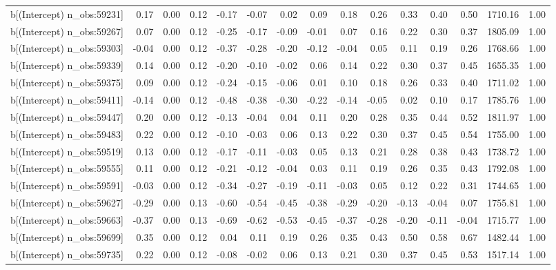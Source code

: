 \begin{table}[ht]
\begin{tabular}{rrrrrrrrrrrrrrr}
  b[(Intercept) n\_obs:59231] & 0.17 & 0.00 & 0.12 & -0.17 & -0.07 & 0.02 & 0.09 & 0.18 & 0.26 & 0.33 & 0.40 & 0.50 & 1710.16 & 1.00 \\ 
  b[(Intercept) n\_obs:59267] & 0.07 & 0.00 & 0.12 & -0.25 & -0.17 & -0.09 & -0.01 & 0.07 & 0.16 & 0.22 & 0.30 & 0.37 & 1805.09 & 1.00 \\ 
  b[(Intercept) n\_obs:59303] & -0.04 & 0.00 & 0.12 & -0.37 & -0.28 & -0.20 & -0.12 & -0.04 & 0.05 & 0.11 & 0.19 & 0.26 & 1768.66 & 1.00 \\ 
  b[(Intercept) n\_obs:59339] & 0.14 & 0.00 & 0.12 & -0.20 & -0.10 & -0.02 & 0.06 & 0.14 & 0.22 & 0.30 & 0.37 & 0.45 & 1655.35 & 1.00 \\ 
  b[(Intercept) n\_obs:59375] & 0.09 & 0.00 & 0.12 & -0.24 & -0.15 & -0.06 & 0.01 & 0.10 & 0.18 & 0.26 & 0.33 & 0.40 & 1711.02 & 1.00 \\ 
  b[(Intercept) n\_obs:59411] & -0.14 & 0.00 & 0.12 & -0.48 & -0.38 & -0.30 & -0.22 & -0.14 & -0.05 & 0.02 & 0.10 & 0.17 & 1785.76 & 1.00 \\ 
  b[(Intercept) n\_obs:59447] & 0.20 & 0.00 & 0.12 & -0.13 & -0.04 & 0.04 & 0.11 & 0.20 & 0.28 & 0.35 & 0.44 & 0.52 & 1811.97 & 1.00 \\ 
  b[(Intercept) n\_obs:59483] & 0.22 & 0.00 & 0.12 & -0.10 & -0.03 & 0.06 & 0.13 & 0.22 & 0.30 & 0.37 & 0.45 & 0.54 & 1755.00 & 1.00 \\ 
  b[(Intercept) n\_obs:59519] & 0.13 & 0.00 & 0.12 & -0.17 & -0.11 & -0.03 & 0.05 & 0.13 & 0.21 & 0.28 & 0.38 & 0.43 & 1738.72 & 1.00 \\ 
  b[(Intercept) n\_obs:59555] & 0.11 & 0.00 & 0.12 & -0.21 & -0.12 & -0.04 & 0.03 & 0.11 & 0.19 & 0.26 & 0.35 & 0.43 & 1792.08 & 1.00 \\ 
  b[(Intercept) n\_obs:59591] & -0.03 & 0.00 & 0.12 & -0.34 & -0.27 & -0.19 & -0.11 & -0.03 & 0.05 & 0.12 & 0.22 & 0.31 & 1744.65 & 1.00 \\ 
  b[(Intercept) n\_obs:59627] & -0.29 & 0.00 & 0.13 & -0.60 & -0.54 & -0.45 & -0.38 & -0.29 & -0.20 & -0.13 & -0.04 & 0.07 & 1755.81 & 1.00 \\ 
  b[(Intercept) n\_obs:59663] & -0.37 & 0.00 & 0.13 & -0.69 & -0.62 & -0.53 & -0.45 & -0.37 & -0.28 & -0.20 & -0.11 & -0.04 & 1715.77 & 1.00 \\ 
  b[(Intercept) n\_obs:59699] & 0.35 & 0.00 & 0.12 & 0.04 & 0.11 & 0.19 & 0.26 & 0.35 & 0.43 & 0.50 & 0.58 & 0.67 & 1482.44 & 1.00 \\ 
  b[(Intercept) n\_obs:59735] & 0.22 & 0.00 & 0.12 & -0.08 & -0.02 & 0.06 & 0.13 & 0.21 & 0.30 & 0.37 & 0.45 & 0.53 & 1517.14 & 1.00 \\ 

\end{tabular}
\end{table}
